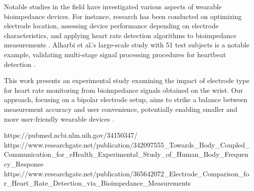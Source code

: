 {Notable studies in the field have investigated various aspects of wearable bioimpedance devices. For instance, research has been conducted on optimizing electrode location, assessing device performance depending on electrode characteristics, and applying heart rate detection algorithms to bioimpedance measurements \cite{towards, PubMedArticle, NewSource7}. Alharbi et al.'s large-scale study with 51 test subjects is a notable example, validating multi-stage signal processing procedures for heartbeat detection \cite{towards, NewSource8}.

This work presents an experimental study examining the impact of electrode type for heart rate monitoring from bioimpedance signals obtained on the wrist. Our approach, focusing on a bipolar electrode setup, aims to strike a balance between measurement accuracy and user convenience, potentially enabling smaller and more user-friendly wearable devices \cite{towards}.

https://pubmed.ncbi.nlm.nih.gov/34150347/
https://www.researchgate.net/publication/342097555_Towards_Body_Coupled_Communication_for_eHealth_Experimental_Study_of_Human_Body_Frequency_Response
https://www.researchgate.net/publication/365642072_Electrode_Comparison_for_Heart_Rate_Detection_via_Bioimpedance_Measurements
}




